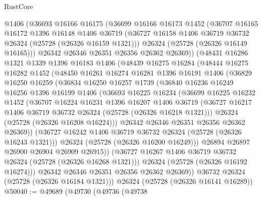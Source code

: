 \begin{lexlean}{RustCore}
\begin{coremodule}
    @1406
    (@36693
      @16166
      @16175
      (@36699
        @16166
        @16173
        @1452
        (@36707
          @16165
          @16172
          @1396
          @16148
          @1406
          @36719
          (@36727 @16158 @1406 @36719 @36732 @26324 (@25728 (@26326 @16159 @1321)))
          @26324
          (@25728 (@26326 @16149 @16165)))
        @26342
        @26346
        @26351
        @26356
        @26362
        @26369))
    (@48431
      @16286
      @1321
      @1339
      @1396
      @16183
      @1406
      (@48439
        @16275
        @16284
        (@48444
          @16275
          @16282
          @1452
          (@48450
            @16261
            @16274
            @16281
            @1396
            @16191
            @1406
            (@36829
              @16250
              @16259
              (@36834
                @16250
                @16257
                @1739
                (@36840
                  @16236
                  @16249
                  @16256
                  @1396
                  @16199
                  @1406
                  (@36693
                    @16225
                    @16234
                    (@36699
                      @16225
                      @16232
                      @1452
                      (@36707
                        @16224
                        @16231
                        @1396
                        @16207
                        @1406
                        @36719
                        (@36727 @16217 @1406 @36719 @36732 @26324 (@25728 (@26326 @16218 @1321)))
                        @26324
                        (@25728 (@26326 @16208 @16224)))
                      @26342
                      @26346
                      @26351
                      @26356
                      @26362
                      @26369))
                  (@36727 @16242 @1406 @36719 @36732 @26324 (@25728 (@26326 @16243 @1321)))
                  @26324
                  (@25728 (@26326 @16200 @16249)))
                @26894
                @26897
                @26900
                @26904
                @26909
                @26915))
            (@36727 @16267 @1406 @36719 @36732 @26324 (@25728 (@26326 @16268 @1321)))
            @26324
            (@25728 (@26326 @16192 @16274)))
          @26342
          @26346
          @26351
          @26356
          @26362
          @26369))
      @36732
      @26324
      (@25728 (@26326 @16184 @1321)))
    @26324
    (@25728 (@26326 @16141 @16289))
@50040 := @49689
    (@49730
      (@49736
        (@49738

\end{coremodule}
\end{lexlean}

